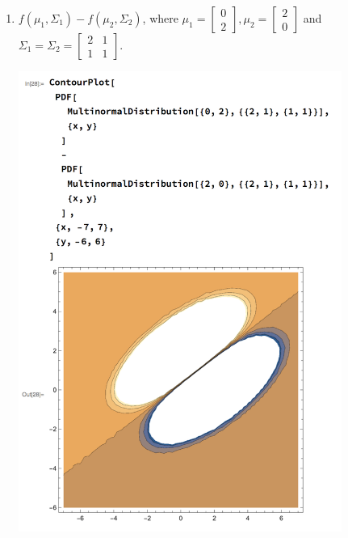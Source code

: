 \documentclass{article}
\begin{document}
\begin{enumerate}[label=(\alph*)]
    \newpage
    \item $f(\mu_1, \Sigma_1) - f(\mu_2, \Sigma_2)$, where $\mu_1 = \begin{bmatrix} 0 \\ 2 \end{bmatrix}, \mu_2 = \begin{bmatrix} 2 \\ 0 \end{bmatrix}$ and $\Sigma_1 = \Sigma_2 = \begin{bmatrix} 2 & 1 \\ 1 & 1 \end{bmatrix}$.
    \begin{mdframed}
      \includegraphics[width=300pt]{img/hw03_2c.png}
    \end{mdframed}


\end{enumerate}
\end{document}
